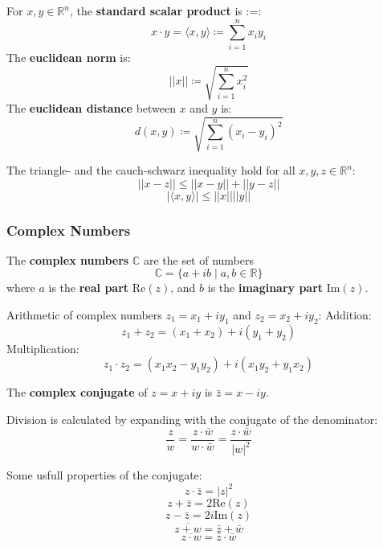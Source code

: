 \begin{definition}
    For $x, y \in \mathbb{R}^n$, the \textbf{standard scalar product} is :=:
    $$x \cdot y = \langle x, y \rangle \coloneqq \sum_{i=1}^n x_i y_i$$
    The \textbf{euclidean norm} is:
    $$||x|| \coloneqq \sqrt{\sum_{i=1}^n x_i^2}$$
    The \textbf{euclidean distance} between $x$ and $y$ is:
    $$d(x, y) \coloneqq \sqrt{\sum_{i=1}^n (x_i - y_i)^2}$$

\end{definition}

\begin{theorem}
    The triangle- and the cauch-schwarz inequality hold for all $x, y, z \in \mathbb{R}^n$:
    $$||x - z|| \leq ||x - y|| + ||y - z||$$
    $$|\langle x, y \rangle| \leq ||x|| ||y||$$
\end{theorem}

\subsubsection{Complex Numbers}

\begin{definition}
    The \textbf{complex numbers} $\mathbb{C}$ are the set of numbers
    $$ \mathbb{C} = \{a + ib \mid a, b \in \mathbb{R}\}$$
    where $a$ is the \textbf{real part} $\text{Re}(z)$, and $b$ is the \textbf{imaginary part} $\text{Im}(z)$.
\end{definition}

\begin{definition}
    Arithmetic of complex numbers $z_1 = x_1 + i y_1$ and $z_2 = x_2 + i y_2$:
    Addition: 
    $$z_1 + z_2 = (x_1 + x_2) + i(y_1 + y_2)$$
    Multiplication: 
    $$z_1 \cdot z_2 = (x_1 x_2 - y_1 y_2) + i(x_1 y_2 + y_1 x_2)$$
\end{definition}

\begin{definition}
    The \textbf{complex conjugate} of $z = x + iy$ is $\bar{z} = x - iy$.
\end{definition}

\begin{important}
    Division is calculated by expanding with the conjugate of the denominator:
    $$\frac{z}{w} = \frac{z \cdot \bar{w}}{w \cdot \bar{w}} = \frac{z \cdot \bar{w}}{|w|^2}$$
\end{important}

\begin{lemma}
    Some usfull properties of the conjugate:
    $$z \cdot \bar{z} = |z|^2$$
    $$z + \bar{z} = 2\text{Re}(z)$$
    $$z - \bar{z} = 2i\text{Im}(z)$$
    $$\overline{z+w} = \bar{z} + \bar{w}$$
    $$\overline{z \cdot w} = \bar{z} \cdot \bar{w}$$
\end{lemma}

